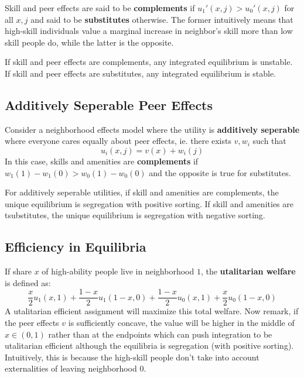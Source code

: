 \documentclass[9pt]{article}
\begin{document}
\begin{multicols}{2}
Skill and peer effects are said to be \textbf{complements} if $u_1'(x,j) > u_0'(x,j)$ for all $x,j$ and said to be \textbf{substitutes} otherwise. The former intuitively means that 
high-skill individuals value a marginal increase in neighbor's skill
more than low skill people do, while the latter is the opposite.
\begin{theorem}
    If skill and peer effects are complements, any integrated equilibrium is unstable. If skill and peer effects are substitutes, any integrated equilibrium is stable.
\end{theorem}

\subsection{Additively Seperable Peer Effects}
Consider a neighborhood effects model where the utility is \textbf{additively seperable} where everyone cares equally about peer effects, ie. there exists $v,w_i$ such that 
\begin{equation}
    u_i(x,j) = v(x) + w_i(j)
\end{equation}
In this case, skills and amenities are \textbf{complements} if $w_1(1) - w_1(0) > w_0(1)-
w_0(0)$ and the opposite is true for substitutes.
\begin{theorem}
   For additively seperable utilities, if skill and amenities are complements, the unique 
   equilibrium is segregation with positive sorting. If skill and amenities are 
   tsubstitutes, the unique equilibrium is segregation with negative sorting.
\end{theorem}

\subsection{Efficiency in Equilibria}

If share $x$ of high-ability people live in neighborhood $1$, the \textbf{utalitarian welfare} is defined as:
\begin{equation*}
    \frac{x}{2}u_1(x,1) + \frac{1-x}{2}u_1(1-x,0)+\frac{1-x}{2}u_0(x,1) + \frac{x}{2}
    u_0(1-x,0)
\end{equation*}
A utalitarian efficient assignment will maximize this total welfare. Now remark, if the 
peer effects $v$ is sufficiently concave, the value will be higher in the middle of
$x \in (0,1)$ rather than at the endpoints which can push integration to be utalitarian
efficient although the equilibria is segregation (with positive sorting). Intuitively, 
this is because the high-skill people don't take into account externalities of leaving 
neighborhood $0$. 


\end{multicols}
\end{document}
